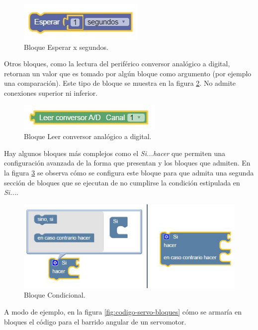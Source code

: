 \begin{figure}[h]
\centering
\includegraphics[scale=1]{./Figures/bloque-esperar.jpg}
\caption{Bloque Esperar x segundos.}
\label{fig:bloque:esperar}
\end{figure}

Otros bloques, como la lectura del periférico conversor analógico a digital, retornan un valor que es tomado por algún bloque como argumento (por ejemplo una comparación). Este tipo de bloque se muestra en la figura \ref{fig:bloque:adc}. No admite conexiones superior ni inferior.

\begin{figure}[H]
\centering
\includegraphics[scale=1]{./Figures/bloque-adc.jpg}
\caption{Bloque Leer conversor analógico a digital.}
\label{fig:bloque:adc}
\end{figure}

Hay algunos bloques más complejos como el \emph{Si...hacer} que permiten una configuración avanzada de la forma que presentan y los bloques que admiten. En la figura \ref{fig:bloque:si} se observa cómo se configura este bloque para que admita una segunda sección de bloques que se ejecutan de no cumplirse la condición estipulada en \emph{Si...}.

\begin{figure}[H]
\centering
\includegraphics[scale=.8]{./Figures/bloque-si.jpg}
\caption{Bloque Condicional.}
\label{fig:bloque:si}
\end{figure}

A modo de ejemplo, en la figura \ref{fig:codigo-servo-bloques} cómo se armaría en bloques el código para el barrido angular de un servomotor.

